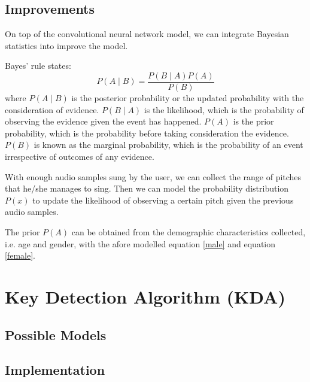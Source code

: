 \subsection{Improvements}

On top of the convolutional neural network model, we can integrate Bayesian statistics into 
improve the model.

Bayes' rule states: 
\[P(A\mid B)=\frac {P(B\mid A)P(A)}{P(B)}\]
where $P(A\mid B)$ is the posterior probability or the updated probability with the consideration of evidence.
$P(B\mid A)$ is the likelihood, which is the probability of observing the evidence given the event has happened.
$P(A)$ is the prior probability, which is the probability before taking consideration the evidence.
$P(B)$ is known as the marginal probability, which is the probability of an event irrespective of outcomes of any evidence. 

With enough audio samples sung by the user, we can collect the range of pitches that he/she manages to sing. Then we can model 
the probability distribution $P(x)$ to update the likelihood of observing a certain pitch given the previous audio samples.

The prior $P(A)$ can be obtained from the demographic characteristics collected, i.e. age and gender, with the afore modelled equation
\ref{male} and equation \ref{female}.

\section{Key Detection Algorithm (KDA)}

\subsection{Possible Models}


\subsection{Implementation}

